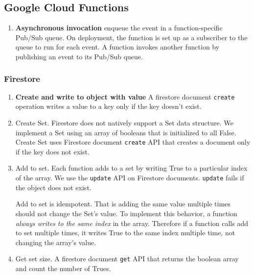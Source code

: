 

\subsection{Google Cloud Functions}

\begin{enumerate}
  \item \textbf{Asynchronous invocation} enqueue the event in a function-specific Pub/Sub queue. On deployment, the function is set up as a subscriber to the queue to run for each event. A function invokes another function by publishing an event to its Pub/Sub queue.
\end{enumerate}

\subsubsection{Firestore}

\begin{enumerate}
  \item \textbf{Create and write to object with value} A firestore document \texttt{create} operation writes a value to a key only if the key doesn't exist.
  \item Create Set. Firestore does not natively support a Set data structure. We implement a Set using an array of booleans that is initialized to all False. Create Set uses Firestore document \texttt{create} API that creates a document only if the key does not exist.
  \item Add to set. Each function adds to a set by writing True to a particular index of the array. We use the \texttt{update} API on Firestore documents. \texttt{update} fails if the object does not exist. 

  Add to set is idempotent. That is adding the same value multiple times should not change the Set's value. To implement this behavior, a function \emph{always writes to the same index} in the array. Therefore if a function calls add to set multiple times, it writes True to the same index multiple time, not changing the array's value.
  \item Get set size. A firestore document \texttt{get} API that returns the boolean array and count the number of Trues.
\end{enumerate}


